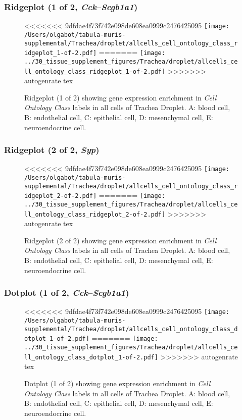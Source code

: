 \subsubsection{Ridgeplot (1 of 2, \emph{Cck}--\emph{Scgb1a1})}
\begin{figure}[h]
\centering
<<<<<<< 9dfdae4f73f742e098de608ea0999c2476425095
\texttt{[image: /Users/olgabot/tabula-muris-supplemental/Trachea/droplet/allcells\_cell\_ontology\_class\_ridgeplot\_1-of-2.pdf]}
=======
\texttt{[image: ../30\_tissue\_supplement\_figures/Trachea/droplet/allcells\_cell\_ontology\_class\_ridgeplot\_1-of-2.pdf]}
>>>>>>> autogenrate tex

\caption{ Ridgeplot (1 of 2)  showing gene expression enrichment in \emph{Cell Ontology Class} labels in all cells of Trachea Droplet. A: blood cell, B: endothelial cell, C: epithelial cell, D: mesenchymal cell, E: neuroendocrine cell.}
\end{figure}


\clearpage

\subsubsection{Ridgeplot (2 of 2, \emph{Syp})}
\begin{figure}[h]
\centering
<<<<<<< 9dfdae4f73f742e098de608ea0999c2476425095
\texttt{[image: /Users/olgabot/tabula-muris-supplemental/Trachea/droplet/allcells\_cell\_ontology\_class\_ridgeplot\_2-of-2.pdf]}
=======
\texttt{[image: ../30\_tissue\_supplement\_figures/Trachea/droplet/allcells\_cell\_ontology\_class\_ridgeplot\_2-of-2.pdf]}
>>>>>>> autogenrate tex

\caption{ Ridgeplot (2 of 2)  showing gene expression enrichment in \emph{Cell Ontology Class} labels in all cells of Trachea Droplet. A: blood cell, B: endothelial cell, C: epithelial cell, D: mesenchymal cell, E: neuroendocrine cell.}
\end{figure}


\clearpage

\subsubsection{Dotplot (1 of 2, \emph{Cck}--\emph{Scgb1a1})}
\begin{figure}[h]
\centering
<<<<<<< 9dfdae4f73f742e098de608ea0999c2476425095
\texttt{[image: /Users/olgabot/tabula-muris-supplemental/Trachea/droplet/allcells\_cell\_ontology\_class\_dotplot\_1-of-2.pdf]}
=======
\texttt{[image: ../30\_tissue\_supplement\_figures/Trachea/droplet/allcells\_cell\_ontology\_class\_dotplot\_1-of-2.pdf]}
>>>>>>> autogenrate tex

\caption{ Dotplot (1 of 2)  showing gene expression enrichment in \emph{Cell Ontology Class} labels in all cells of Trachea Droplet. A: blood cell, B: endothelial cell, C: epithelial cell, D: mesenchymal cell, E: neuroendocrine cell.}
\end{figure}


